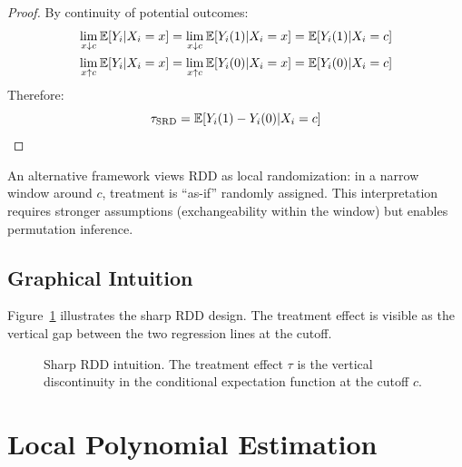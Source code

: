 \begin{proof}
By continuity of potential outcomes:
\begin{align}
    \lim_{x \downarrow c} \mathbb{E}[Y_i | X_i = x] &= \lim_{x \downarrow c} \mathbb{E}[Y_i(1) | X_i = x] = \mathbb{E}[Y_i(1) | X_i = c] \\
    \lim_{x \uparrow c} \mathbb{E}[Y_i | X_i = x] &= \lim_{x \uparrow c} \mathbb{E}[Y_i(0) | X_i = x] = \mathbb{E}[Y_i(0) | X_i = c]
\end{align}
Therefore:
\begin{equation}
    \tau_{\text{SRD}} = \mathbb{E}[Y_i(1) - Y_i(0) | X_i = c]
\end{equation}
\end{proof}

\begin{remark}
An alternative framework views RDD as local randomization: in a narrow window around $c$, treatment is ``as-if'' randomly assigned. This interpretation requires stronger assumptions (exchangeability within the window) but enables permutation inference.
\end{remark}

\subsection{Graphical Intuition}

Figure~\ref{fig:rdd_intuition} illustrates the sharp RDD design. The treatment effect is visible as the vertical gap between the two regression lines at the cutoff.

\begin{figure}[htbp]
\centering
{}
\caption{Sharp RDD intuition. The treatment effect $\tau$ is the vertical discontinuity in the conditional expectation function at the cutoff $c$.}
\label{fig:rdd_intuition}
\end{figure}

\section{Local Polynomial Estimation}
\label{sec:rdd_local_poly}

